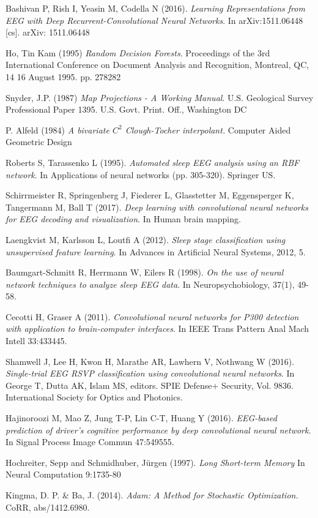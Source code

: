 \documentclass{article}
\begin{document}
\begin{thebibliography}{99}

	Bashivan  P,  Rish  I,  Yeasin  M,  Codella  N  (2016). 
	\textit{Learning  Representations from  EEG with  Deep Recurrent-Convolutional  Neural Networks}. 
	In arXiv:1511.06448 [cs]. arXiv: 1511.06448

	Ho, Tin Kam (1995)
	\textit{Random Decision Forests}. 
	Proceedings of the 3rd International Conference on Document Analysis and Recognition, Montreal, QC, 14		16 August 1995. pp. 278282

	Snyder, J.P. (1987) 
	\textit{Map Projections - A Working Manual}. 
	U.S. Geological Survey Professional Paper 1395. U.S. Govt. Print.
	Off., Washington DC
	
	P. Alfeld (1984)
	\textit{A bivariate $C^2$ Clough-Tocher interpolant.} 
	Computer Aided Geometric Design

	Roberts S, Tarassenko L (1995).
	\textit{Automated sleep EEG analysis using an RBF network}.
	In Applications of neural networks (pp. 305-320). Springer US.

	Schirrmeister R, Springenberg J, Fiederer L, Glasstetter M, Eggensperger K, Tangermann M, Ball T (2017). 
	\textit{Deep learning with convolutional neural networks for EEG decoding and visualization}.
	In Human brain mapping.

	Laengkvist M, Karlsson L, Loutfi A (2012).
	\textit{Sleep stage classification using unsupervised feature learning}.
	In Advances in Artificial Neural Systems, 2012, 5.

	Baumgart-Schmitt R, Herrmann W, Eilers R (1998). 
	\textit{On the use of neural network techniques to analyze sleep EEG data}.
	In Neuropsychobiology, 37(1), 49-58.

	Cecotti H, Graser A (2011).
	\textit{Convolutional neural networks for P300 detection with application to brain-computer interfaces}. 
	In IEEE Trans Pattern Anal Mach Intell 33:433445.

	Shamwell J, Lee H, Kwon H, Marathe AR, Lawhern V, Nothwang W (2016).
	\textit{Single-trial EEG RSVP classification using convolutional neural networks}. 
	In George T, Dutta AK, Islam MS, editors. SPIE Defense+ Security, Vol. 9836. International Society for Optics and Photonics.

	Hajinoroozi M, Mao Z, Jung T-P, Lin C-T, Huang Y (2016).
	\textit{EEG-based prediction of driver's cognitive performance by deep convolutional neural network}. 
	In Signal Process Image Commun 47:549555.
	
	Hochreiter, Sepp and Schmidhuber, Jürgen (1997).
	\textit{Long Short-term Memory}
	In Neural Computation 9:1735-80

	Kingma, D. P. \& Ba, J. (2014). 
	\textit{Adam: A Method for Stochastic Optimization.} 
	CoRR, abs/1412.6980. 

	
\end{thebibliography}
\end{document}
